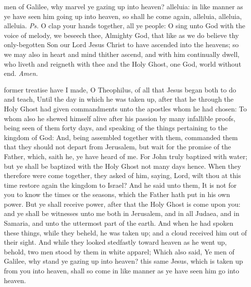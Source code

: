 

\properantiphonfix

\introit
{} men of Galilee, why marvel ye gazing up into heaven? alleluia: in like manner as ye have seen him going up into heaven, so shall he come again, alleluia, alleluia, alleluia. \textit{Ps.} O clap your hands together, all ye people: O sing unto God with the voice of melody,
\collect
{} we beseech thee, Almighty God, that like as we do believe thy only-begotten Son our Lord Jesus Christ to have ascended into the heavens; so we may also in heart and mind thither ascend, and with him continually dwell, who liveth and reigneth with thee and the Holy Ghost, one God, world without end. \textit{Amen.}

 former treatise have I made, O Theophilus, of all that Jesus began both to do and teach, Until the day in which he was taken up, after that he through the Holy Ghost had given commandments unto the apostles whom he had chosen: To whom also he shewed himself alive after his passion by many infallible proofs, being seen of them forty days, and speaking of the things pertaining to the kingdom of God: And, being assembled together with them, commanded them that they should not depart from Jerusalem, but wait for the promise of the Father, which, saith he, ye have heard of me. For John truly baptized with water; but ye shall be baptized with the Holy Ghost not many days hence. When they therefore were come together, they asked of him, saying, Lord, wilt thou at this time restore again the kingdom to Israel? And he said unto them, It is not for you to know the times or the seasons, which the Father hath put in his own power. But ye shall receive power, after that the Holy Ghost is come upon you: and ye shall be witnesses unto me both in Jerusalem, and in all Judaea, and in Samaria, and unto the uttermost part of the earth. And when he had spoken these things, while they beheld, he was taken up; and a cloud received him out of their sight. And while they looked stedfastly toward heaven as he went up, behold, two men stood by them in white apparel; Which also said, Ye men of Galilee, why stand ye gazing up into heaven? this same Jesus, which is taken up from you into heaven, shall so come in like manner as ye have seen him go into heaven.

